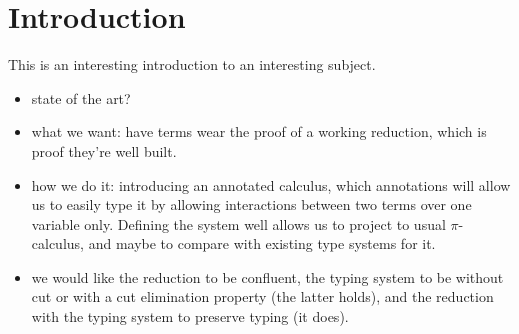 
\section*{Introduction}

This is an interesting introduction to an interesting subject.
\begin{itemize}
	\item state of the art?
	\item what we want: have terms wear the proof of a working reduction, which is proof they're well built.
	\item how we do it: introducing an annotated calculus, which annotations will allow us to easily type it by allowing interactions between two terms over one variable only. Defining the system well allows us to project to usual $\pi$-calculus, and maybe to compare with existing type systems for it.
	\item we would like the reduction to be confluent, the typing system to be without cut or with a cut elimination property (the latter holds), and the reduction with the typing system to preserve typing (it does).
\end{itemize}
